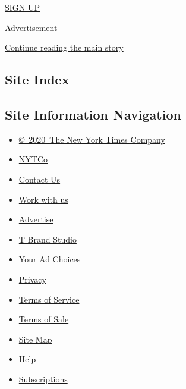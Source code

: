 \href{/newsletters/signup/TZ}{SIGN UP}

Advertisement

\protect\hyperlink{after-mktg}{Continue reading the main story}

\hypertarget{site-index}{%
\subsection{Site Index}\label{site-index}}

\hypertarget{site-information-navigation}{%
\subsection{Site Information
Navigation}\label{site-information-navigation}}

\begin{itemize}
\tightlist
\item
  \href{https://help.nytimes3xbfgragh.onion/hc/en-us/articles/115014792127-Copyright-notice}{©~2020~The
  New York Times Company}
\end{itemize}

\begin{itemize}
\tightlist
\item
  \href{https://www.nytco.com/}{NYTCo}
\item
  \href{https://help.nytimes3xbfgragh.onion/hc/en-us/articles/115015385887-Contact-Us}{Contact
  Us}
\item
  \href{https://www.nytco.com/careers/}{Work with us}
\item
  \href{https://nytmediakit.com/}{Advertise}
\item
  \href{http://www.tbrandstudio.com/}{T Brand Studio}
\item
  \href{https://www.nytimes3xbfgragh.onion/privacy/cookie-policy\#how-do-i-manage-trackers}{Your
  Ad Choices}
\item
  \href{https://www.nytimes3xbfgragh.onion/privacy}{Privacy}
\item
  \href{https://help.nytimes3xbfgragh.onion/hc/en-us/articles/115014893428-Terms-of-service}{Terms
  of Service}
\item
  \href{https://help.nytimes3xbfgragh.onion/hc/en-us/articles/115014893968-Terms-of-sale}{Terms
  of Sale}
\item
  \href{https://spiderbites.nytimes3xbfgragh.onion}{Site Map}
\item
  \href{https://help.nytimes3xbfgragh.onion/hc/en-us}{Help}
\item
  \href{https://www.nytimes3xbfgragh.onion/subscription?campaignId=37WXW}{Subscriptions}
\end{itemize}
